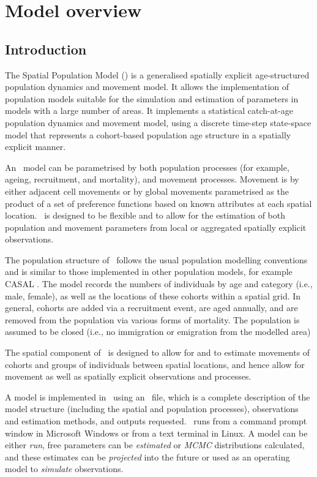 \section{Model overview\label{sec:getting-started}}

\subsection{Introduction}

The Spatial Population Model (\SPM) is a generalised spatially explicit age-structured population dynamics and movement model. It allows the implementation of population models suitable for the simulation and estimation of parameters in models with a large number of areas. It implements a statistical catch-at-age population dynamics and movement model, using a discrete time-step state-space model that represents a cohort-based population age structure in a spatially explicit manner. 

An \SPM\ model can be parametrised by both population processes (for example, ageing, recruitment, and mortality), and movement processes. Movement is by either adjacent cell movements or by global movements parametrised as the product of a set of preference functions based on known attributes at each spatial location. \SPM\ is designed to be flexible and to allow for the estimation of both population and movement parameters from local or aggregated spatially explicit observations. 

The population structure of \SPM\ follows the usual population modelling conventions and is similar to those implemented in other population models, for example CASAL \citep{1388}. The model records the numbers of individuals by age and category (i.e., male, female), as well as the locations of these cohorts within a spatial grid. In general, cohorts are added via a recruitment event, are aged annually, and are removed from the population via various forms of mortality. The population is assumed to be closed (i.e., no immigration or emigration from the modelled area)

The spatial component of \SPM\ is designed to allow for and to estimate movements of cohorts and groups of individuals between spatial locations, and hence allow for movement as well as spatially explicit observations and processes. 

A model is implemented in \SPM\ using an \config\ file, which is a complete description of the model structure (including the spatial and population processes), observations and estimation methods, and outputs requested. \SPM\ runs from a command prompt window in Microsoft Windows or from a text terminal in Linux. A model can be either \emph{run}, free parameters can be \emph{estimated} or \emph{MCMC} distributions calculated, and these estimates can be \emph{projected} into the future or used as an operating model to \emph{simulate} observations.

